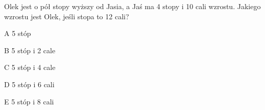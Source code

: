 \begin{tresc}
Olek jest o pół stopy wyższy od Jasia, a Jaś ma 4 stopy i 10 cali wzrostu. Jakiego wzrostu jest Olek, jeśli stopa to 12 cali?
\end{tresc}
\begin{wariant}{A} 5 stóp \end{wariant}
\begin{wariant}{B} 5 stóp i 2 cale \end{wariant}
\begin{wariant}{C} 5 stóp i 4 cale \end{wariant}
\begin{wariant}{D} 5 stóp i 6 cali \end{wariant}
\begin{wariant}{E} 5 stóp i 8 cali \end{wariant}
